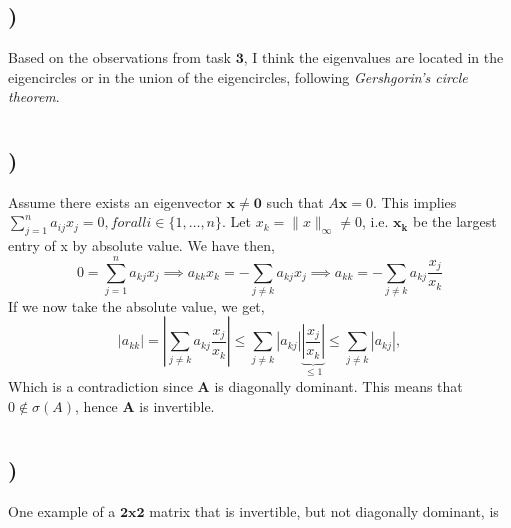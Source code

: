 \documentclass[a4paper,10pt,norsk]{article}
\begin{document}
\section{}
\subsection{)}
Based on the observations from task $\mathbf{3}$, I think the eigenvalues are located in the eigencircles or in the union of the eigencircles, following \emph{Gershgorin's circle theorem}.

\section{}
\subsection{)}
Assume there exists an eigenvector $\mathbf{x\neq{0}}$ such that $A\mathbf{x}=0$. This implies $\sum_{j=1}^n a_{ij}x_j = 0, for all i \in \{1, \ldots, n\}$. Let $x_k = \|x\|_\infty\neq{0}$, i.e. $\mathbf{x_k}$ be the largest entry of x by absolute value. We have then,
\begin{equation*}
    0 = \sum_{j=1}^n a_{kj}x_j \implies a_{kk}x_k = -\sum_{j\ne k} a_{kj}x_j \implies a_{kk} = -\sum_{j\ne k} a_{kj}\frac{x_j}{x_k}
\end{equation*}
If we now take the absolute value, we get,
\begin{equation*}
    |a_{kk}| = \left|\sum_{j\ne k} a_{kj}\frac{x_j}{x_k}\right| \leq \sum_{j\ne k} |a_{kj}|\underbrace{\left|\frac{x_j}{x_k}\right|}_{\leq 1} \leq \sum_{j\ne k} |a_{kj}|,
\end{equation*}
Which is a contradiction since $\mathbf{A}$ is diagonally dominant. This means that $0\notin \sigma(A)$, hence $\mathbf{A}$ is invertible.

\section{}
\subsection{)}
One example of a $\mathbf{2 x 2}$ matrix that is invertible, but not diagonally dominant, is
\end{document}
